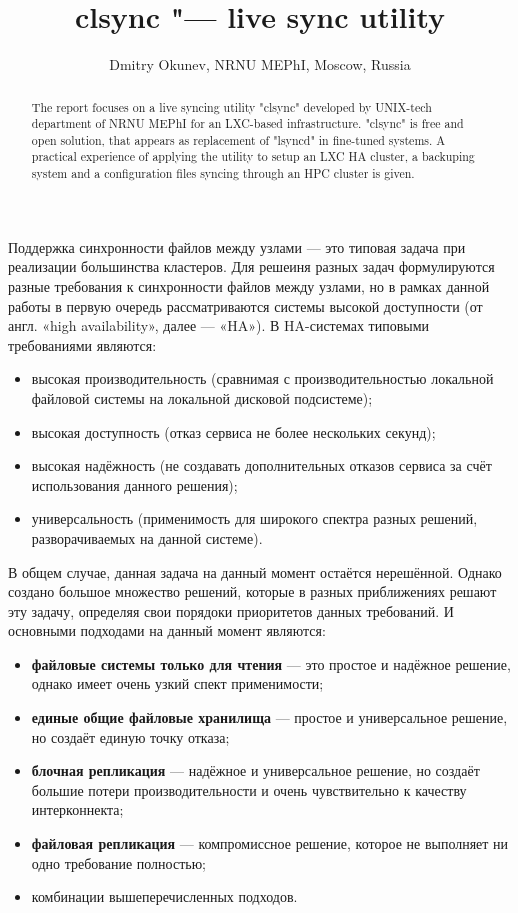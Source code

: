 \documentclass[10pt, a5paper]{article}
\begin{document}
\title{clsync "--- live sync utility}
\author{Dmitry Okunev, NRNU MEPhI, Moscow, Russia}
\maketitle
\begin{abstract}
The report focuses on a live syncing utility "clsync" developed by UNIX-tech department of NRNU MEPhI for an LXC-based infrastructure. "clsync" is free and open solution, that appears as replacement of "lsyncd" in fine-tuned systems. A practical experience of applying the utility to setup an LXC HA cluster, a backuping system and a configuration files syncing through an HPC cluster is given.
\end{abstract}
Поддержка синхронности файлов между узлами — это типовая задача при реализации большинства кластеров. Для решеиня разных задач формулируются разные требования к синхронности файлов между узлами, но в рамках данной работы в первую очередь рассматриваются системы высокой доступности (от англ. «high availability», далее — «HA»). В HA-системах типовыми требованиями являются:

\begin{itemize}
  \item высокая производительность (сравнимая с производительностью локальной файловой системы на локальной дисковой подсистеме);
  \item высокая доступность (отказ сервиса не более нескольких секунд);
  \item высокая надёжность (не создавать дополнительных отказов сервиса за счёт использования данного решения);
  \item универсальность (применимость для широкого спектра разных решений, разворачиваемых на данной системе).
\end{itemize}

В общем случае, данная задача на данный момент остаётся нерешённой. Однако создано большое множество решений, которые в разных приближениях решают эту задачу, определяя свои порядоки приоритетов данных требований. И основными подходами на данный момент являются:

\begin{itemize}
  \item \textbf{файловые системы только для чтения} — это простое и надёжное решение, однако имеет очень узкий спект применимости;
  \item \textbf{единые общие файловые хранилища} — простое и универсальное решение, но создаёт единую точку отказа;
  \item \textbf{блочная репликация} — надёжное и универсальное решение, но создаёт большие потери производительности и очень чувствительно к качеству интерконнекта;
  \item \textbf{файловая репликация} — компромиссное решение, которое не выполняет ни одно требование полностью;
  \item комбинации вышеперечисленных подходов.
\end{itemize}
\end{document}
